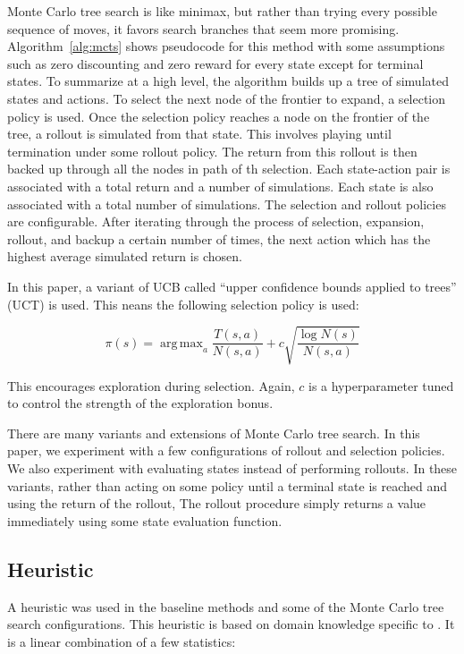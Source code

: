 \documentclass[letterpaper]{article} %
\DeclareMathOperator*{\argmax}{arg\,max}
\begin{document}
Monte Carlo tree search is like minimax, but rather than trying every possible sequence of moves, it favors search branches that seem more promising. Algorithm~\ref{alg:mcts} shows pseudocode for this method with some assumptions such as zero discounting and zero reward for every state except for terminal states. To summarize at a high level, the algorithm builds up a tree of simulated states and actions. To select the next node of the frontier to expand, a selection policy is used. Once the selection policy reaches a node on the frontier of the tree, a rollout is simulated from that state. This involves playing until termination under some rollout policy. The return from this rollout is then backed up through all the nodes in path of th selection. Each state-action pair is associated with a total return and a number of simulations. Each state is also associated with a total number of simulations. The selection and rollout policies are configurable. After iterating through the process of selection, expansion, rollout, and backup a certain number of times, the next action which has the highest average simulated return is chosen.

In this paper, a variant of UCB called ``upper confidence bounds applied to trees'' (UCT) is used. This neans the following selection policy is used:

\[\pi(s) = \argmax_{a} \frac{T(s,a)}{N(s,a)} + c\sqrt{\frac{\log N(s)}{N(s,a)}}\]

This encourages exploration during selection. Again, \(c\) is a hyperparameter tuned to control the strength of the exploration bonus.

There are many variants and extensions of Monte Carlo tree search. In this paper, we experiment with a few configurations of rollout and selection policies. We also experiment with evaluating states instead of performing rollouts. In these variants, rather than acting on some policy until a terminal state is reached and using the return of the rollout, The rollout procedure simply returns a value immediately using some state evaluation function.

\subsection{Heuristic}

A heuristic was used in the baseline methods and some of the Monte Carlo tree search configurations. This heuristic is based on domain knowledge specific to \tetris{}. It is a linear combination of a few statistics:
\end{document}
